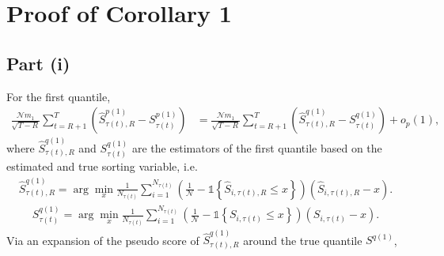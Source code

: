 
\section{Proof of Corollary 1}
\label{Proof of cor:error}

\subsection{Part (i)}

For the first quantile,
\begin{align*}
\frac{\mathcal{N}m_{1}}{\sqrt{T-R}}\sum_{t=R+1}^{T} \left( \widehat{S}_{\tau(t),R}^{p(1)}-S_{\tau(t)}^{p(1)}\right) &= \frac{\mathcal{N}m_{1}}{\sqrt{T-R}}\sum_{t=R+1}^{T} \left( \widehat{S}_{\tau(t),R}^{q(1)}-S_{\tau(t)}^{q(1)}\right) +o_{p}(1),
\end{align*}
where $\widehat{S}_{\tau(t),R}^{q(1)}$ and $S_{\tau(t)}^{q(1)}$ are the estimators of the first quantile based on the estimated and true sorting variable, i.e.
\begin{align*}
\widehat{S}_{\tau(t),R}^{q(1)}=\arg\min_{x}\frac{1}{N_{\tau(t)}}\sum_{i=1}^{N_{\tau(t)}}\left( \frac{1}{\mathcal{N}}-\mathds{1}\left\{ \widehat{S}_{i,\tau(t),R}\leq x\right\} \right)\left( \widehat{S}_{i,\tau(t),R}-x\right).
\end{align*}
\begin{align*}
S_{\tau(t)}^{q(1)}=\arg\min_{x}\frac{1}{N_{\tau(t)}}\sum_{i=1}^{N_{\tau(t)}}\left( \frac{1}{\mathcal{N}}-\mathds{1}\left\{ S_{i,\tau(t)}\leq x\right\} \right)\left( S_{i,\tau(t)}-x\right).
\end{align*}
Via an expansion of the pseudo score of $\widehat{S}_{\tau(t),R}^{q(1)}$ around the true quantile $S^{q(1)}$,
